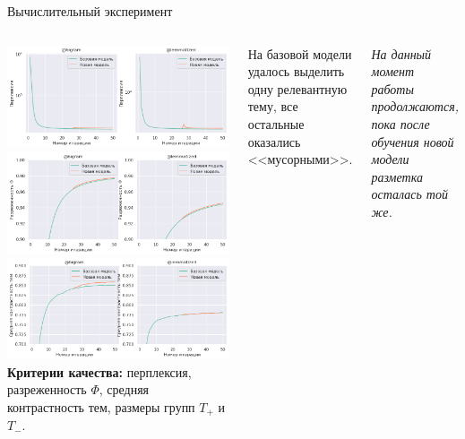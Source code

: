 \documentclass{beamer}
\begin{document}
\begin{frame}{Вычислительный эксперимент}

\begin{columns}[c]
\includegraphics[width=1\textwidth]{perplexity_v2}
\includegraphics[width=1\textwidth]{sparsity_v2}
\includegraphics[width=1\textwidth]{avg_contrast_v2}
    \textbf{Критерии качества:} перплексия, разреженность $\Phi$, средняя контрастность тем, размеры групп $T_+$ и $T_-$.

    {\footnotesize На базовой модели удалось выделить одну релевантную тему, все остальные оказались <<мусорными>>. }

    {\footnotesize \textit{На данный момент работы продолжаются, пока после обучения новой модели разметка осталась той же.}}
\end{columns}

\end{frame}
\end{document}
